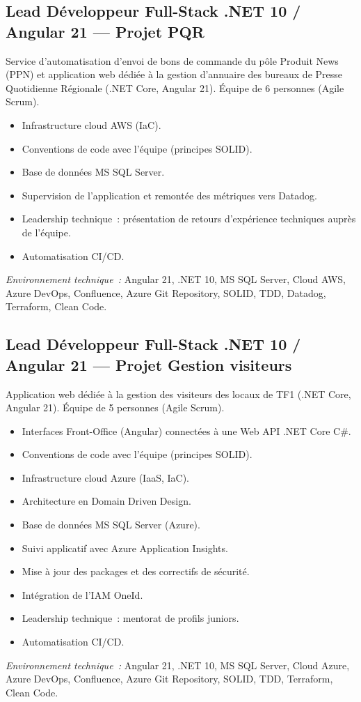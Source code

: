\documentclass[10pt,a4paper]{article}
\begin{document}
\vspace{6pt}

\subsection*{Lead Développeur Full-Stack .NET 10 / Angular 21 --- Projet PQR}
\color{darkgray}
Service d'automatisation d'envoi de bons de commande du pôle Produit News (PPN) et application web dédiée à la gestion d'annuaire des bureaux de Presse Quotidienne Régionale (.NET Core, Angular 21). Équipe de 6 personnes (Agile Scrum).
\begin{itemize}
  \item Infrastructure cloud AWS (IaC).
  \item Conventions de code avec l'équipe (principes SOLID).
  \item Base de données MS SQL Server.
  \item Supervision de l'application et remontée des métriques vers Datadog.
  \item Leadership technique~: présentation de retours d'expérience techniques auprès de l'équipe.
  \item Automatisation CI/CD.
\end{itemize}
\textit{Environnement technique~:} Angular 21, .NET 10, MS SQL Server, Cloud AWS, Azure DevOps, Confluence, Azure Git Repository, SOLID, TDD, Datadog, Terraform, Clean Code.

\vspace{6pt}

\subsection*{Lead Développeur Full-Stack .NET 10 / Angular 21 --- Projet Gestion visiteurs}
\color{darkgray}
Application web dédiée à la gestion des visiteurs des locaux de TF1 (.NET Core, Angular 21). Équipe de 5 personnes (Agile Scrum).
\begin{itemize}
  \item Interfaces Front-Office (Angular) connectées à une Web API .NET Core C\#.
  \item Conventions de code avec l'équipe (principes SOLID).
  \item Infrastructure cloud Azure (IaaS, IaC).
  \item Architecture en Domain Driven Design.
  \item Base de données MS SQL Server (Azure).
  \item Suivi applicatif avec Azure Application Insights.
  \item Mise à jour des packages et des correctifs de sécurité.
  \item Intégration de l'IAM OneId.
  \item Leadership technique~: mentorat de profils juniors.
  \item Automatisation CI/CD.
\end{itemize}
\textit{Environnement technique~:} Angular 21, .NET 10, MS SQL Server, Cloud Azure, Azure DevOps, Confluence, Azure Git Repository, SOLID, TDD, Terraform, Clean Code.
\end{document}
